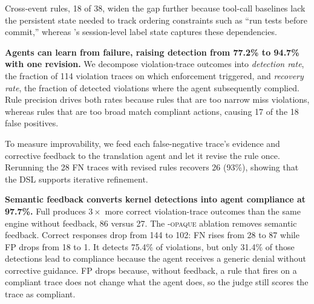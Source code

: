 Cross-event rules, 18 of 38, widen the gap further because tool-call baselines lack the persistent state needed to track ordering constraints such as ``run tests before commit,'' whereas \sys{}'s session-level label state captures these dependencies.

\noindent\textbf{Agents can learn from failure, raising detection from 77.2\% to 94.7\% with one revision.}
We decompose violation-trace outcomes into \emph{detection rate}, the fraction of 114 violation traces on which enforcement triggered, and \emph{recovery rate}, the fraction of detected violations where the agent subsequently complied.
Rule precision drives both rates because rules that are too narrow miss violations, whereas rules that are too broad match compliant actions, causing 17 of the 18 false positives.

To measure improvability, we feed each false-negative trace's evidence and corrective feedback to the translation agent and let it revise the rule once.
Rerunning the 28 FN traces with revised rules recovers 26 (93\%), showing that the DSL supports iterative refinement.

\noindent\textbf{Semantic feedback converts kernel detections into agent compliance at 97.7\%.}
Full \sys{} produces $3\times$ more correct violation-trace outcomes than the same engine without feedback, 86 versus 27.
The \textsc{\sys{}-opaque} ablation removes semantic feedback. Correct responses drop from 144 to 102: FN rises from 28 to 87 while FP drops from 18 to 1.
It detects 75.4\% of violations, but only 31.4\% of those detections lead to compliance because the agent receives a generic denial without corrective guidance.
FP drops because, without feedback, a rule that fires on a compliant trace does not change what the agent does, so the judge still scores the trace as compliant.


